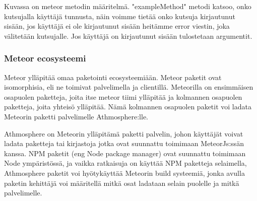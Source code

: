 \documentclass[11pt,a4paper,titlepage,oneside]{article}
\begin{document}
Kuvassa on meteor metodin määritelmä. "exampleMethod"{} metodi katsoo, onko kutsujalla käyttäjä tunnusta, näin voimme tietää onko kutsuja kirjautunut sisään,
jos käyttäjä ei ole kirjautunut sisään heitämme error viestin, joka välitetään kutsujalle.
Jos käyttäjä on kirjautunut sisään tulostetaan argumentit. 

\medskip




\subsubsection{Meteor ecosysteemi}




Meteor ylläpitää omaa paketointi ecosysteemiään.
Meteor paketit ovat isomorphisia, eli ne toimivat palvelimella ja clientillä.
Meteorilla on ensimmäisen osapuolen paketteja, joita itse meteor tiimi ylläpitää ja kolmannen osapuolen paketteja,
joita yhteisö ylläpitää. Nämä kolmannen osapuolen paketit voi ladata Meteorin paketti palvelimelle Athmosphere:lle.
\medskip


Athmosphere on Meteorin ylläpitämä paketti palvelin, johon käyttäjät voivat ladata paketteja tai kirjastoja jotka ovat suunnattu toimimaan MeteorJs:ssän kanssa.
NPM paketit (eng Node package manager) ovat suunnattu toimimaan Node ympäristössä, ja vaikka ratkaisuja on käyttää NPM paketteja selaimella, 
Athmosphere paketit voi hyötykäyttää Meteorin build systeemiä, jonka avulla paketin kehittäjä voi määritellä mitkä osat ladataan selain puolelle ja mitkä palvelimelle.\citemissing









\newpage
{}%
\end{document}

